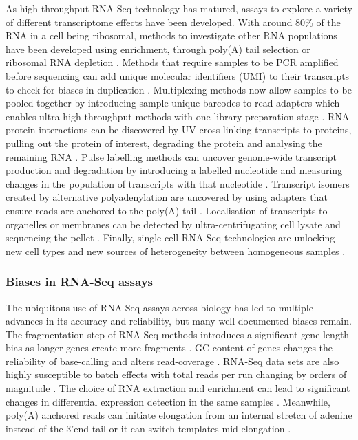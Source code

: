 \documentclass[../main.tex]{subfiles}
\begin{document}
As high-throughput RNA-Seq technology has matured, assays to explore a variety of different transcriptome effects have been developed.
With around 80\% of the RNA in a cell being ribosomal, methods to investigate other RNA populations have been developed using enrichment, through poly(A) tail selection or ribosomal RNA depletion \parencite{Stark2019}. 
Methods that require samples to be PCR amplified before sequencing can add unique molecular identifiers (UMI) to their transcripts to check for biases in duplication \parencite{Kivioja2011}.
Multiplexing methods now allow samples to be pooled together by introducing sample unique barcodes to read adapters which enables ultra-high-throughput methods with one library preparation stage \parencite{Craig2008}.
RNA-protein interactions can be discovered by UV cross-linking transcripts to proteins, pulling out the protein of interest, degrading the protein and analysing the remaining RNA \parencite{Granneman2009}.
Pulse labelling methods can uncover genome-wide transcript production and degradation by introducing a labelled nucleotide and measuring changes in the population of transcripts with that nucleotide \parencite{Chan2018}.
Transcript isomers created by alternative polyadenylation are uncovered by using adapters that ensure reads are anchored to the poly(A) tail \parencite{Pelechano2013}. 
Localisation of transcripts to organelles or membranes can be detected by ultra-centrifugating cell lysate and sequencing the pellet \parencite{Iserman2020}.
Finally, single-cell RNA-Seq technologies are unlocking new cell types and new sources of heterogeneity between homogeneous samples \parencite{Jovic2022}.

\subsubsection{Biases in RNA-Seq assays}

The ubiquitous use of RNA-Seq assays across biology has led to multiple advances in its accuracy and reliability, but many well-documented biases remain.
The fragmentation step of RNA-Seq methods introduces a significant gene length bias as longer genes create more fragments \parencite{Oshlack2009}.
GC content of genes changes the reliability of base-calling and alters read-coverage \parencite{Dohm2008}.
RNA-Seq data sets are also highly susceptible to batch effects with total reads per run changing by orders of magnitude \parencite{Auer2010}.
The choice of RNA extraction and enrichment can lead to significant changes in differential expression detection in the same samples \parencite{Sultan2014}.
Meanwhile, poly(A) anchored reads can initiate elongation from an internal stretch of adenine instead of the 3'end tail or it can switch templates mid-elongation \parencite{Balazs2019}.
\end{document}
